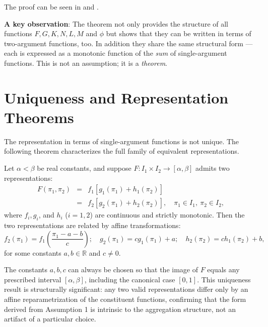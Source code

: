 The proof can be seen in \cite{aczel1964functional} and \cite{castillo2004functional}.

\textbf{A key observation}: The theorem not only provides the structure of all functions $F, G, K, N, L, M$ and $\phi$ but shows that they can be written in terms of two-argument functions, too. In addition they share the same structural form — each is expressed as a monotonic function of the \emph{sum} of single-argument functions. This is not an assumption; it is a \emph{theorem}.

\section{Uniqueness and Representation Theorems}\label{sec:uniqueness}

The representation in terms of single-argument functions is not unique. The following
theorem characterizes the full family of equivalent representations.

\begin{theorem}
\label{thm:uniqueness}
Let $\alpha < \beta$ be real constants, and suppose $F: I_1 \times I_2 \to [\alpha,\beta]$
admits two representations:
\begin{eqnarray}
F(\pi_1,\pi_2) &=& f_1[g_1(\pi_1) + h_1(\pi_2)]\nonumber\\
 &=& f_2[g_2(\pi_1) + h_2(\pi_2)], \quad \pi_1 \in I_1,\ \pi_2 \in I_2,
\label{eq:tworepresentations}
\end{eqnarray}
where $f_i, g_i$, and $h_i$ ($i = 1,2$) are continuous and strictly monotonic. Then
the two representations are related by affine transformations:
\begin{equation}
f_2(\pi_1) = f_1\!\left(\frac{\pi_1 - a - b}{c}\right); \quad g_2(\pi_1) = cg_1(\pi_1) + a; \quad h_2(\pi_2) = ch_1(\pi_2) + b,
\label{eq:uniquenessrelations}
\end{equation}
for some constants $a, b \in \mathbb{R}$ and $c \neq 0$.
\end{theorem}

The constants $a, b, c$ can always be chosen so that the image of $F$ equals any
prescribed interval $[\alpha,\beta]$, including the canonical case $[0,1]$.
This uniqueness result is structurally significant: any two valid representations
differ only by an affine reparametrization of the constituent functions, confirming
that the form derived from Assumption 1 is intrinsic to the aggregation structure, not
an artifact of a particular choice.

